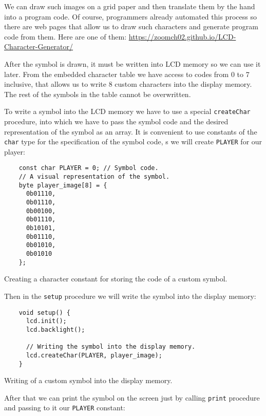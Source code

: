 \documentclass[../sparc.tex]{subfiles}
\begin{document}

We can draw such images on a grid paper and then translate them by the hand into
a program code.  Of course, programmers already automated this process so there
are web pages that allow us to draw such characters and generate program code
from them.  Here are one of them:
\url{https://zoomch02.github.io/LCD-Character-Generator/}

After the symbol is drawn, it must be written into LCD memory so we can use it
later.  From the embedded character table we have access to codes from 0 to 7
inclusive, that allows us to write 8 custom characters into the display memory.
The rest of the symbols in the table cannot be overwritten.

To write a symbol into the LCD memory we have to use a special
\texttt{createChar} procedure, into which we have to pass the symbol
code and the desired representation of the symbol as an array.  It is convenient
to use constants of the \texttt{char} type for the specification of the
symbol code, s we will create \texttt{PLAYER} for our player:

\begin{listing}[H]
  \begin{verbatim}
    const char PLAYER = 0; // Symbol code.
    // A visual representation of the symbol.
    byte player_image[8] = {
      0b01110,
      0b01110,
      0b00100,
      0b01110,
      0b10101,
      0b01110,
      0b01010,
      0b01010
    };
  \end{verbatim}
  \caption{Creating a character constant for storing the code of a custom
    symbol.}
  \label{listing:game-dev-lcd-custom-char-const}
\end{listing}

Then in the \texttt{setup} procedure we will write the symbol into the
display memory:

\begin{listing}[H]
  \begin{verbatim}
    void setup() {
      lcd.init();
      lcd.backlight();

      // Writing the symbol into the display memory.
      lcd.createChar(PLAYER, player_image);
    }
  \end{verbatim}
  \caption{Writing of a custom symbol into the display memory.}
  \label{listing:game-dev-lcd-create-char}
\end{listing}

After that we can print the symbol on the screen just by calling
\texttt{print} procedure and passing to it our \texttt{PLAYER}
constant:
\end{document}
